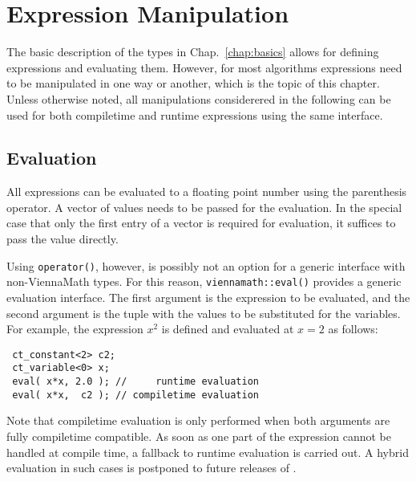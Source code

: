 \chapter{Expression Manipulation} \label{chap:manipulation}

The basic description of the types in Chap.~\ref{chap:basics} allows for defining expressions and evaluating them.
However, for most algorithms expressions need to be manipulated in one way or another, which is the topic of this chapter.
Unless otherwise noted, all manipulations considerered in the following can be used for both compiletime and runtime expressions using the same interface.


 \section{Evaluation}
All {\ViennaMath} expressions can be evaluated to a floating point number using the parenthesis operator. 
A vector of values needs to be passed for the evaluation. In the special case that only the first entry of a vector is required for evaluation, it suffices to
pass the value directly.

Using \lstinline|operator()|, however, is possibly not an option for a generic interface with non-ViennaMath types.
For this reason, \lstinline|viennamath::eval()| provides a generic evaluation interface. 
The first argument is the expression to be evaluated, and the second argument is the tuple with the values to be substituted for the variables.
For example, the expression $x^2$ is defined and evaluated at $x=2$ as follows:
\begin{lstlisting}
 ct_constant<2> c2;
 ct_variable<0> x;
 eval( x*x, 2.0 ); //     runtime evaluation
 eval( x*x,  c2 ); // compiletime evaluation
\end{lstlisting}
Note that compiletime evaluation is only performed when both arguments are fully compiletime compatible.
As soon as one part of the expression cannot be handled at compile time, a fallback to runtime evaluation is carried out.
A hybrid evaluation in such cases is postponed to future releases of {\ViennaMath}.

